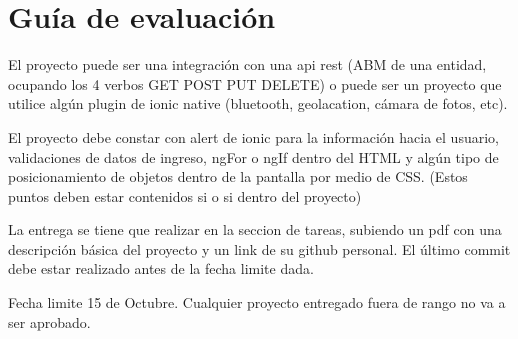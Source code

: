 \section{Guía de evaluación}
\begin{todolist}
  \item El proyecto puede ser una integración con una api rest  (ABM de una entidad, ocupando los 4 verbos GET POST PUT DELETE) o puede ser un proyecto que utilice algún plugin de ionic native (bluetooth, geolacation, cámara de fotos, etc).
  \item El proyecto debe constar con alert de ionic para la información hacia el usuario, validaciones de datos de ingreso, ngFor o ngIf dentro del HTML y algún tipo de posicionamiento de objetos dentro de la pantalla por medio de CSS. (Estos puntos deben estar contenidos si o si dentro del proyecto)
  \item La entrega se tiene que realizar en la seccion de tareas, subiendo un pdf con una descripción básica del proyecto y un link de su github personal. El último commit debe estar realizado antes de la fecha limite dada.
  \item Fecha limite 15 de Octubre. Cualquier proyecto entregado fuera de rango no va a ser aprobado.
\end{todolist}	
